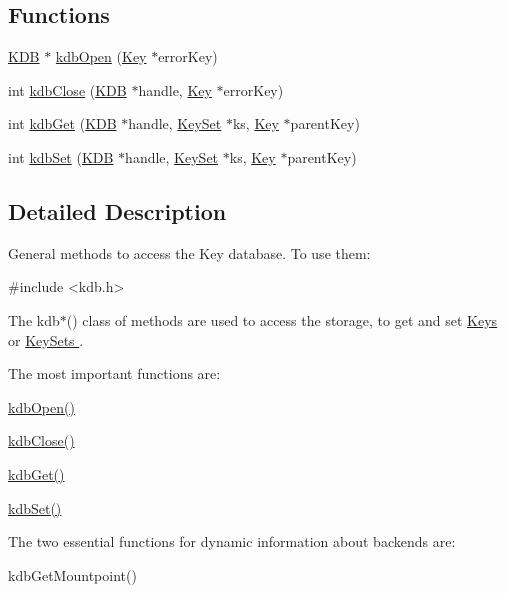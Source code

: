 \subsection*{Functions}
\begin{DoxyCompactItemize}
\item 
\hyperlink{struct__KDB}{KDB} $\ast$ \hyperlink{group__kdb_ga6808defe5870f328dd17910aacbdc6ca}{kdbOpen} (\hyperlink{struct__Key}{Key} $\ast$errorKey)
\item 
int \hyperlink{group__kdb_gadb54dc9fda17ee07deb9444df745c96f}{kdbClose} (\hyperlink{struct__KDB}{KDB} $\ast$handle, \hyperlink{struct__Key}{Key} $\ast$errorKey)
\item 
int \hyperlink{group__kdb_ga28e385fd9cb7ccfe0b2f1ed2f62453a1}{kdbGet} (\hyperlink{struct__KDB}{KDB} $\ast$handle, \hyperlink{struct__KeySet}{KeySet} $\ast$ks, \hyperlink{struct__Key}{Key} $\ast$parentKey)
\item 
int \hyperlink{group__kdb_ga11436b058408f83d303ca5e996832bcf}{kdbSet} (\hyperlink{struct__KDB}{KDB} $\ast$handle, \hyperlink{struct__KeySet}{KeySet} $\ast$ks, \hyperlink{struct__Key}{Key} $\ast$parentKey)
\end{DoxyCompactItemize}


\subsection{Detailed Description}
General methods to access the Key database. To use them: 
\begin{DoxyCode}
 #include <kdb.h>
\end{DoxyCode}


The kdb$\ast$() class of methods are used to access the storage, to get and set \hyperlink{group__key}{Keys } or \hyperlink{group__keyset}{KeySets }.

The most important functions are:
\begin{DoxyItemize}
\item \hyperlink{group__kdb_ga6808defe5870f328dd17910aacbdc6ca}{kdbOpen()}
\item \hyperlink{group__kdb_gadb54dc9fda17ee07deb9444df745c96f}{kdbClose()}
\item \hyperlink{group__kdb_ga28e385fd9cb7ccfe0b2f1ed2f62453a1}{kdbGet()}
\item \hyperlink{group__kdb_ga11436b058408f83d303ca5e996832bcf}{kdbSet()}
\end{DoxyItemize}

The two essential functions for dynamic information about backends are:
\begin{DoxyItemize}
\item kdbGetMountpoint()
\end{DoxyItemize}

